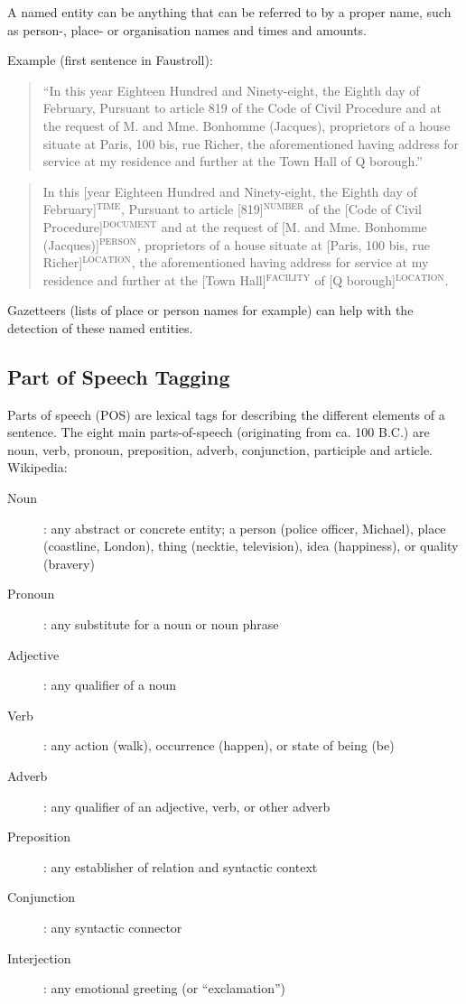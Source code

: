 A named entity can be anything that can be referred to by a proper name, such as person-, place- or organisation names and times and amounts.

Example (first sentence in Faustroll):

\begin{quote}
  ``In this year Eighteen Hundred and Ninety-eight, the Eighth day of February, Pursuant to article 819 of the Code of Civil Procedure and at the request of M. and Mme. Bonhomme (Jacques), proprietors of a house situate at Paris, 100 bis, rue Richer, the aforementioned having address for service at my residence and further at the Town Hall of Q borough.''
\end{quote}

\begin{quote}
  In this [year Eighteen Hundred and Ninety-eight, the Eighth day of February]$^{\text{TIME}}$, Pursuant to article [819]$^{\text{NUMBER}}$ of the [Code of Civil Procedure]$^{\text{DOCUMENT}}$ and at the request of [M. and Mme. Bonhomme (Jacques)]$^{\text{PERSON}}$, proprietors of a house situate at [Paris, 100 bis, rue Richer]$^{\text{LOCATION}}$, the aforementioned having address for service at my residence and further at the [Town Hall]$^{\text{FACILITY}}$ of [Q borough]$^{\text{LOCATION}}$.
\end{quote}

Gazetteers (lists of place or person names for example) can help with the detection of these named entities.


\subsection*{Part of Speech Tagging}

Parts of speech (POS) are lexical tags for describing the different elements of a sentence. The eight main parts-of-speech (originating from ca. 100 B.C.) are noun, verb, pronoun, preposition, adverb, conjunction, participle and article.
Wikipedia:

\begin{description}
  \item [Noun]: any abstract or concrete entity; a person (police officer, Michael), place (coastline, London), thing (necktie, television), idea (happiness), or quality (bravery)
  \item [Pronoun]: any substitute for a noun or noun phrase
  \item [Adjective]: any qualifier of a noun
  \item [Verb]: any action (walk), occurrence (happen), or state of being (be)
  \item [Adverb]: any qualifier of an adjective, verb, or other adverb
  \item [Preposition]: any establisher of relation and syntactic context
  \item [Conjunction]: any syntactic connector
  \item [Interjection]: any emotional greeting (or ``exclamation'')
\end{description}

